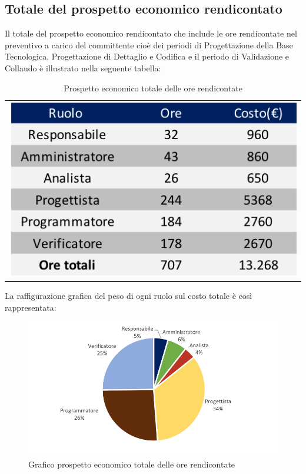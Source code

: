 \subsection{Totale del prospetto economico rendicontato}
Il totale del prospetto economico rendicontato che  include le ore rendicontate nel preventivo a carico del committente cioè dei periodi di Progettazione della Base Tecnologica, Progettazione di Dettaglio e Codifica e il periodo di Validazione e Collaudo è illustrato nella seguente tabella:

\begin{table}[!ht]
	\begin{center}
		\begin{tabular}{c}
			\includegraphics{images/tabellaOreRendicontateEuro.png}
		\end{tabular}
		\caption{Prospetto economico totale delle ore rendicontate}
	\end{center}
\end{table}

La raffigurazione grafica del peso di ogni ruolo sul costo totale è così rappresentata:

\begin{figure}[!ht]
	\begin{center}
		\includegraphics[scale=0.90]{images/grafoOreRendicontateEuro.png}
		\caption{Grafico prospetto economico totale delle ore rendicontate}
	\end{center}
\end{figure}

